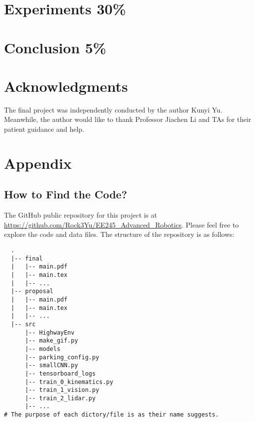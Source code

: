 \documentclass{article}
\begin{document}
\section{Experiments 30\%}\label{sec:experiments}

\section{Conclusion 5\%}\label{sec:conclusion}














\newpage

\section*{Acknowledgments}
The final project was independently conducted by the author Kunyi Yu. Meanwhile, the author would like to thank Professor Jiachen Li and TAs for their patient guidance and help.




\appendix
\section*{Appendix}
\subsection*{How to Find the Code?}
The GitHub public repository for this project is at \url{https://github.com/Rock3Yu/EE245_Advanced_Robotics}. Please feel free to explore the code and data files. The structure of the repository is as follows:

\begin{verbatim}
  .
  |-- final
  |   |-- main.pdf
  |   |-- main.tex
  |   |-- ...
  |-- proposal
  |   |-- main.pdf
  |   |-- main.tex
  |   |-- ...
  |-- src
      |-- HighwayEnv
      |-- make_gif.py
      |-- models
      |-- parking_config.py
      |-- smallCNN.py
      |-- tensorboard_logs
      |-- train_0_kinematics.py
      |-- train_1_vision.py
      |-- train_2_lidar.py
      |-- ...
# The purpose of each dictory/file is as their name suggests.
\end{verbatim}
\end{document}
